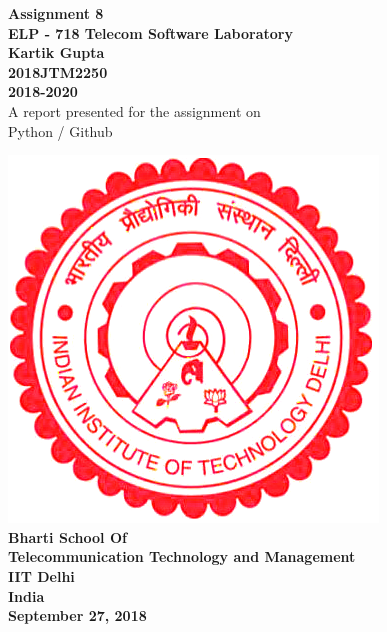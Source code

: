 \documentclass[12pt]{article}
\begin{document}

\begin{center}
\textbf{Assignment 8 \\
\vspace{10mm}
ELP - 718 Telecom Software Laboratory \\
\vspace{5mm}
Kartik Gupta \\
\vspace{2mm}
2018JTM2250 \\
\vspace{2mm}
2018-2020} \\
\vspace{10mm}
A report presented for the assignment on \\
\vspace{2mm}
Python / Github

\vspace{30mm}
\includegraphics[scale=0.5]{logo.png} \\
\vspace{12mm}
\textbf{Bharti School Of} \\
\vspace{2mm}
\textbf{Telecommunication Technology and Management} \\
\vspace{2mm}
\textbf{IIT Delhi} \\
\vspace{2mm}
\textbf{India} \\
\vspace{2mm}
\textbf{September 27, 2018}

\end{center}
\end{document}
